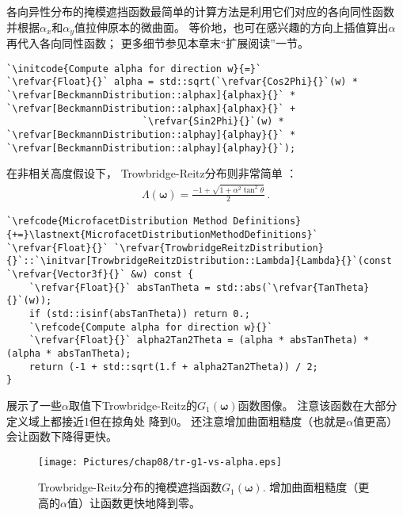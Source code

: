 各向异性分布的掩模遮挡函数最简单的计算方法是利用它们对应的各向同性函数
并根据$\alpha_x$和$\alpha_y$值拉伸原本的微曲面。
等价地，也可在感兴趣的方向上插值算出$\alpha$再代入各向同性函数；
更多细节参见本章末“扩展阅读”一节。
\begin{lstlisting}
`\initcode{Compute alpha for direction w}{=}`
`\refvar{Float}{}` alpha = std::sqrt(`\refvar{Cos2Phi}{}`(w) * `\refvar[BeckmannDistribution::alphax]{alphax}{}` * `\refvar[BeckmannDistribution::alphax]{alphax}{}` +
                        `\refvar{Sin2Phi}{}`(w) * `\refvar[BeckmannDistribution::alphay]{alphay}{}` * `\refvar[BeckmannDistribution::alphay]{alphay}{}`);
\end{lstlisting}

在非相关高度假设下，
Trowbridge-Reitz分布则非常简单
：
\begin{align*}
    \Lambda({\bm\omega})=\frac{-1+\sqrt{1+\alpha^2\tan^2\theta}}{2}\, .
\end{align*}
\begin{lstlisting}
`\refcode{MicrofacetDistribution Method Definitions}{+=}\lastnext{MicrofacetDistributionMethodDefinitions}`
`\refvar{Float}{}` `\refvar{TrowbridgeReitzDistribution}{}`::`\initvar[TrowbridgeReitzDistribution::Lambda]{Lambda}{}`(const `\refvar{Vector3f}{}` &w) const {
    `\refvar{Float}{}` absTanTheta = std::abs(`\refvar{TanTheta}{}`(w));
    if (std::isinf(absTanTheta)) return 0.;
    `\refcode{Compute alpha for direction w}{}`
    `\refvar{Float}{}` alpha2Tan2Theta = (alpha * absTanTheta) * (alpha * absTanTheta);
    return (-1 + std::sqrt(1.f + alpha2Tan2Theta)) / 2;
}
\end{lstlisting}

展示了一些$\alpha$取值下Trowbridge-Reitz的$G_1({\bm\omega})$函数图像。
注意该函数在大部分定义域上都接近1但在掠角处
降到0。
还注意增加曲面粗糙度（也就是$\alpha$值更高）会让函数下降得更快。
\begin{figure}[htbp]
    \centering
    \texttt{[image: Pictures/chap08/tr-g1-vs-alpha.eps]}
    \caption{Trowbridge-Reitz分布的掩模遮挡函数$G_1({\bm\omega})$.
    增加曲面粗糙度（更高的$\alpha$值）让函数更快地降到零。}
    \label{fig:8.18}
\end{figure}

